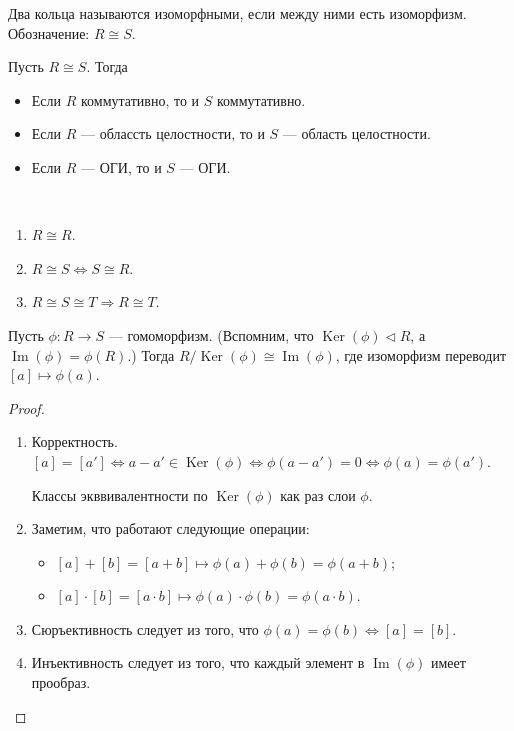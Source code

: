 \documentclass[12pt,a4paper]{article}
\DeclareMathOperator{\Img}{Im}
\DeclareMathOperator{\Ker}{Ker}
\begin{document}
    \begin{definition}
        Два кольца называются изоморфными, если между ними есть изоморфизм. Обозначение: $R \cong S$.
    \end{definition}

    \begin{statement}
        Пусть $R \cong S$. Тогда
        \begin{itemize}
            \item Если $R$ коммутативно, то и $S$ коммутативно.
            \item Если $R$ --- облассть целостности, то и $S$ --- область целостности.
            \item Если $R$ --- ОГИ, то и $S$ --- ОГИ.
        \end{itemize}
    \end{statement}

    \begin{statement}\ 
        \begin{enumerate}
            \item $R \cong R$.
            \item $R \cong S \Leftrightarrow S \cong R$.
            \item $R \cong S \cong T \Rightarrow R \cong T$.
        \end{enumerate}
    \end{statement}

    \begin{theorem}
        Пусть $\phi: R \to S$ --- гомоморфизм. (Вспомним, что $\Ker(\phi) \triangleleft R$, а $\Img(\phi) = \phi(R)$.) Тогда $R/\Ker(\phi) \cong \Img(\phi)$, где изоморфизм переводит $[a] \mapsto \phi(a)$.
    \end{theorem}

    \begin{proof}\ 
        \begin{enumerate}
            \item Корректность. $[a] = [a'] \Leftrightarrow a - a' \in \Ker(\phi) \Leftrightarrow \phi(a - a') = 0 \Leftrightarrow \phi(a) = \phi(a')$.
                \begin{remark}
                    Классы экввивалентности по $\Ker(\phi)$ как раз слои $\phi$.
                \end{remark}
            \item Заметим, что работают следующие операции:
                \begin{itemize}
                    \item $[a] + [b] = [a + b] \mapsto \phi(a) + \phi(b) = \phi(a + b)$;
                    \item $[a] \cdot [b] = [a \cdot b] \mapsto \phi(a) \cdot \phi(b) = \phi(a \cdot b)$. 
                \end{itemize}
            \item Сюръективность следует из того, что $\phi(a) = \phi(b) \Leftrightarrow [a] = [b]$.
            \item Инъективность следует из того, что каждый элемент в $\Img(\phi)$ имеет прообраз.
        \end{enumerate}
    \end{proof}
\end{document}
